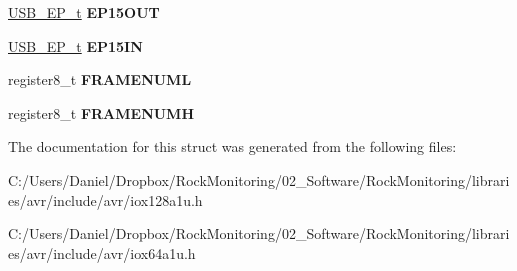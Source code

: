 \begin{DoxyCompactItemize}
\item 
\hyperlink{struct_u_s_b___e_p__struct}{U\+S\+B\+\_\+\+E\+P\+\_\+t} {\bfseries E\+P15\+O\+UT}\hypertarget{struct_u_s_b___e_p___t_a_b_l_e__struct_ae2b44070013a113af75acb1278526e82}{}\label{struct_u_s_b___e_p___t_a_b_l_e__struct_ae2b44070013a113af75acb1278526e82}

\item 
\hyperlink{struct_u_s_b___e_p__struct}{U\+S\+B\+\_\+\+E\+P\+\_\+t} {\bfseries E\+P15\+IN}\hypertarget{struct_u_s_b___e_p___t_a_b_l_e__struct_af3369bacc2dd1b030ecd911d61d5a3c8}{}\label{struct_u_s_b___e_p___t_a_b_l_e__struct_af3369bacc2dd1b030ecd911d61d5a3c8}

\item 
register8\+\_\+t {\bfseries F\+R\+A\+M\+E\+N\+U\+ML}\hypertarget{struct_u_s_b___e_p___t_a_b_l_e__struct_a50aaa60d41b08e521e13ad2ab3d0aa9d}{}\label{struct_u_s_b___e_p___t_a_b_l_e__struct_a50aaa60d41b08e521e13ad2ab3d0aa9d}

\item 
register8\+\_\+t {\bfseries F\+R\+A\+M\+E\+N\+U\+MH}\hypertarget{struct_u_s_b___e_p___t_a_b_l_e__struct_a84ae5e312d09e8e0e1a5c00ee1b1bbd7}{}\label{struct_u_s_b___e_p___t_a_b_l_e__struct_a84ae5e312d09e8e0e1a5c00ee1b1bbd7}

\end{DoxyCompactItemize}


The documentation for this struct was generated from the following files\+:\begin{DoxyCompactItemize}
\item 
C\+:/\+Users/\+Daniel/\+Dropbox/\+Rock\+Monitoring/02\+\_\+\+Software/\+Rock\+Monitoring/libraries/avr/include/avr/iox128a1u.\+h\item 
C\+:/\+Users/\+Daniel/\+Dropbox/\+Rock\+Monitoring/02\+\_\+\+Software/\+Rock\+Monitoring/libraries/avr/include/avr/iox64a1u.\+h\end{DoxyCompactItemize}
